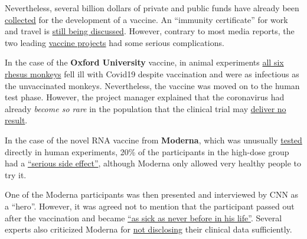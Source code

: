 Nevertheless, several billion dollars of private and public funds have
already been
\href{https://www.nytimes.com/2020/05/04/world/europe/eu-coronavirus-vaccine.html}{collected}
for the development of a vaccine. An ``immunity certificate'' for work
and travel is
\href{https://www.theguardian.com/politics/2020/may/03/coronavirus-health-passports-for-uk-possible-in-months}{still
being discussed}. However, contrary to most media reports, the two
leading
\href{https://www.thelancet.com/journals/lancet/article/PIIS0140-6736(20)31252-6/fulltext}{vaccine
projects} had some serious complications.

In the case of the \textbf{Oxford University} vaccine, in animal
experiments
\href{https://www.dailymail.co.uk/sciencetech/article-8331709/Oxford-coronavirus-vaccine-does-not-stop-infection-experts-warn.html}{all
six rhesus monkeys} fell ill with Covid19 despite vaccination and were
as infectious as the unvaccinated monkeys. Nevertheless, the vaccine was
moved on to the human test phase. However, the project manager explained
that the coronavirus had already \emph{become so rare} in the population
that the clinical trial may
\href{https://www.telegraph.co.uk/news/2020/05/23/oxford-university-covid-19-vaccine-trial-has-50-per-cent-chance/}{deliver
no result}.

In the case of the novel RNA vaccine from \textbf{Moderna}, which was
unusually
\href{https://www.statnews.com/2020/03/11/researchers-rush-to-start-moderna-coronavirus-vaccine-trial-without-usual-animal-testing/}{tested}
directly in human experiments, 20\% of the participants in the high-dose
group had a
\href{https://childrenshealthdefense.org/news/vaccine-trial-catastrophe-moderna-vaccine-has-20-serious-injury-rate-in-high-dose-group/}{``serious
side effect''}, although Moderna only allowed very healthy people to try
it.

One of the Moderna participants was then presented and interviewed by
CNN as a ``hero''. However, it was agreed not to mention that the
participant passed out after the vaccination and became
\href{https://childrenshealthdefense.org/news/modernas-guinea-pig-sickest-in-his-life-after-being-injected-with-experimental-vaccine/}{``as
sick as never before in his life''}. Several experts also criticized
Moderna for
\href{https://www.statnews.com/2020/05/19/vaccine-experts-say-moderna-didnt-produce-data-critical-to-assessing-covid-19-vaccine/}{not
disclosing} their clinical data sufficiently.

